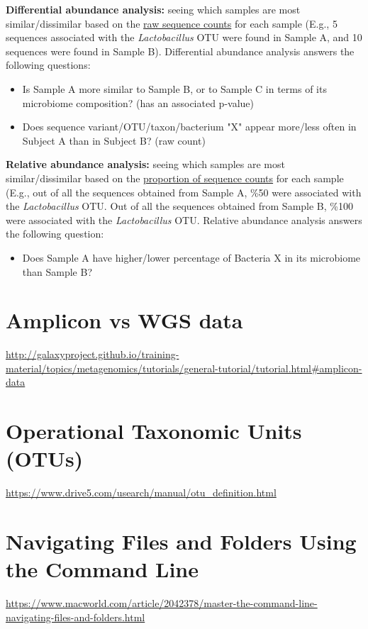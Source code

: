 \begin{fullpage}
    \textbf{Differential abundance analysis:} seeing which samples are most similar/dissimilar based on the \ul{raw sequence counts} for each sample (E.g., 5 sequences associated with the \textit{Lactobacillus} OTU were found in Sample A, and 10 sequences were found in Sample B). Differential abundance analysis answers the following questions:
    \begin{itemize}
        \item Is Sample A more similar to Sample B, or to Sample C in terms of its microbiome composition? (has an associated p-value)
        \item Does sequence variant/OTU/taxon/bacterium "X" appear more/less often in Subject A than in Subject B? (raw count) 
    \end{itemize}
    \textbf{Relative abundance analysis:} seeing which samples are most similar/dissimilar based on the \ul{proportion of sequence counts} for each sample (E.g., out of all the sequences obtained from Sample A, \%50 were associated with the \textit{Lactobacillus} OTU. Out of all the sequences obtained from Sample B, \%100 were associated with the \textit{Lactobacillus} OTU. Relative abundance analysis answers the following question:
    \begin{itemize}
    \item Does Sample A have higher/lower percentage of Bacteria X in its microbiome than Sample B?
    \end{itemize}


    \section{Amplicon vs WGS data}
    \label{appendix:amplicon}
    \url{http://galaxyproject.github.io/training-material/topics/metagenomics/tutorials/general-tutorial/tutorial.html#amplicon-data}


    \section{Operational Taxonomic Units (OTUs)}
    \label{appendix:otu}
    \url{https://www.drive5.com/usearch/manual/otu_definition.html}


    \section{Navigating Files and Folders Using the Command Line}
    \label{appendix:command-line-navigate}
    \url{https://www.macworld.com/article/2042378/master-the-command-line-navigating-files-and-folders.html}
    

\end{fullpage}
